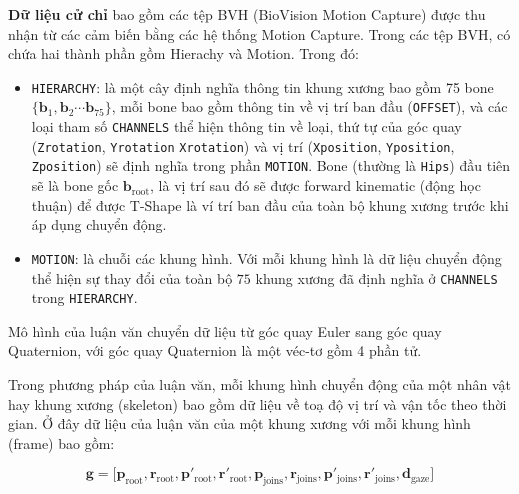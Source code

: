 \textbf{Dữ liệu cử chỉ} bao gồm các tệp BVH (BioVision Motion Capture) được thu nhận từ các cảm biến bằng các hệ thống Motion Capture. Trong các tệp BVH, có chứa hai thành phần gồm Hierachy và Motion. Trong đó:

\begin{itemize}
	\item \texttt{HIERARCHY}: là một cây định nghĩa thông tin khung xương bao gồm 75 bone $\{ \mathbf{b}_1, \mathbf{b}_2 \cdots \mathbf{b}_{75} \} $, mỗi bone bao gồm thông tin về vị trí ban đầu (\texttt{OFFSET}), và các loại tham số \texttt{CHANNELS} thể hiện thông tin về loại, thứ tự của góc quay (\texttt{Zrotation}, \texttt{Yrotation} \texttt{Xrotation}) và vị trí (\texttt{Xposition}, \texttt{Yposition}, \texttt{Zposition}) sẽ định nghĩa trong phần \texttt{MOTION}. Bone (thường là \texttt{Hips}) đầu tiên sẽ là bone gốc $\mathbf{b}_{\text{root}}$, là vị trí sau đó sẽ được forward kinematic (động học thuận) để được T-Shape là ví trí ban đầu của toàn bộ khung xương trước khi áp dụng chuyển động.
	
	\item \texttt{MOTION}: là chuỗi các khung hình. Với mỗi khung hình là dữ liệu chuyển động thể hiện sự thay đổi của toàn bộ $75$ khung xương đã định nghĩa ở \texttt{CHANNELS} trong \texttt{HIERARCHY}.
\end{itemize}






Mô hình của luận văn chuyển dữ liệu từ góc quay Euler sang góc quay Quaternion, với góc quay Quaternion là một véc-tơ gồm 4 phần tử.



Trong phương pháp của luận văn, mỗi khung hình chuyển động của một nhân vật hay khung xương (skeleton) bao gồm dữ liệu về toạ độ vị trí và vận tốc theo thời gian.
Ở đây dữ liệu của luận văn của một khung xương với mỗi khung hình (frame) bao gồm:

\begin{equation} \label{eq:gesturevector}
	\mathbf{g} = \Big[ \mathbf{p}_{\text{root}},  \mathbf{r}_{\text{root}},
	\mathbf{ p }'_{\text{root}},  \mathbf{r}'_{\text{root}},
	\mathbf{p}_{\text{joins}},  \mathbf{r}_{\text{joins}},
	\mathbf{p}'_{\text{joins}},  \mathbf{r}'_{\text{joins}},
	\mathbf{d}_{\text{gaze}}
	\Big]
\end{equation}

